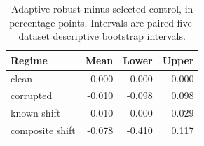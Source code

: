 \begin{table}[ht]\centering\small
\caption{Adaptive robust minus selected control, in percentage points. Intervals are paired five-dataset descriptive bootstrap intervals.}
\begin{tabular}{lrrr}\toprule Regime & Mean & Lower & Upper \\\midrule
clean & 0.000 & 0.000 & 0.000 \\
corrupted & -0.010 & -0.098 & 0.098 \\
known shift & 0.010 & 0.000 & 0.029 \\
composite shift & -0.078 & -0.410 & 0.117 \\
\bottomrule\end{tabular}\end{table}
